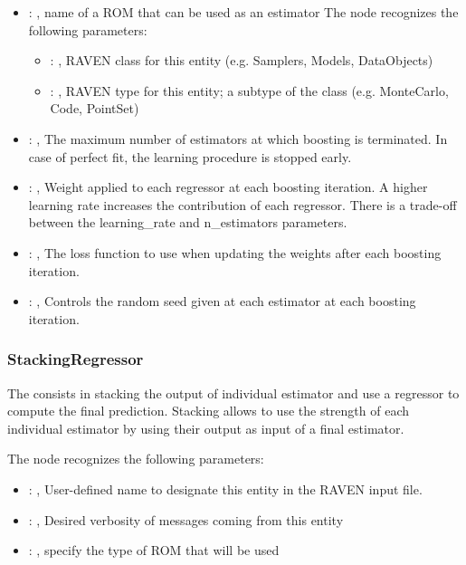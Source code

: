 \begin{itemize}
    \item {}: , 
      name of a ROM that can be used as an estimator
      The  node recognizes the following parameters:
        \begin{itemize}
          \item {}: , 
            RAVEN class for this entity (e.g. Samplers, Models, DataObjects)
          \item {}: , 
            RAVEN type for this entity; a subtype of the class (e.g. MonteCarlo, Code, PointSet)
      \end{itemize}

    \item {}: , 
      The maximum number of estimators at which boosting is
      terminated. In case of perfect fit, the learning procedure is
      stopped early.

    \item {}: , 
      Weight applied to each regressor at each boosting iteration.
      A higher learning rate increases the contribution of each regressor.
      There is a trade-off between the learning\_rate and n\_estimators
      parameters.

    \item {}: , 
      The loss function to use when updating the weights after each
      boosting iteration.

    \item {}: , 
      Controls the random seed given at each estimator at each
      boosting iteration.
  \end{itemize}


\subsubsection{StackingRegressor}
  The  consists in stacking the output of individual estimator and
  use a regressor to compute the final prediction. Stacking allows to use the strength of each
  individual estimator by using their output as input of a final estimator.

  The  node recognizes the following parameters:
    \begin{itemize}
      \item {}: , 
        User-defined name to designate this entity in the RAVEN input file.
      \item {}: , 
        Desired verbosity of messages coming from this entity
      \item {}: , 
        specify the type of ROM that will be used
  \end{itemize}

